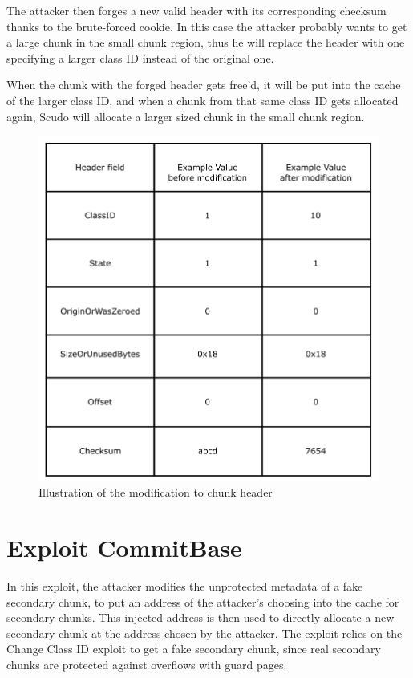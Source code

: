 \documentclass[a4paper,11pt,oneside]{report}
\begin{document}
The attacker then forges a new valid header with its corresponding checksum thanks to
the brute-forced cookie. 
In this case the attacker probably wants to get a large chunk in
the small chunk region, thus he will replace the header with one specifying a larger class
ID instead of the original one.

When the chunk with the forged header gets free'd, it will be put into the cache of the
larger class ID, and when a chunk from that same class ID gets allocated again, Scudo will
allocate a larger sized chunk in the small chunk region.

\begin{figure}[h!]
  \centering
  \includegraphics[width=\linewidth]{figures/ChangeClassID.png}
  \caption{Illustration of the modification to chunk header}\label{fig:ChangeClassID}
\end{figure}


\section{Exploit CommitBase}

In this exploit, the attacker modifies the unprotected metadata of a fake secondary chunk,
to put an address of the attacker's choosing into the cache for secondary chunks. This
injected address is then used to directly allocate a new secondary chunk at the address
chosen by the attacker. The exploit relies on the Change Class ID exploit to get a fake
secondary chunk, since real secondary chunks are protected against overflows with guard
pages.
\end{document}
